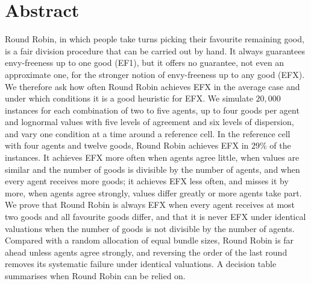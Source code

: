 \chapter*{Abstract}

Round Robin, in which people take turns picking their favourite remaining good, is a fair
division procedure that can be carried out by hand. It always guarantees envy-freeness up to one
good (EF1), but it offers no guarantee, not even an approximate one, for the stronger notion of
envy-freeness up to any good (EFX). We therefore ask how often Round Robin achieves EFX in the
average case and under which conditions it is a good heuristic for EFX. We simulate
$20{,}000$ instances for each combination of two to five agents, up to four goods per agent and
lognormal values with five levels of agreement and six levels of dispersion, and vary one
condition at a time around a reference cell. In the reference cell with four agents and twelve
goods, Round Robin achieves EFX in $29\%$ of the instances. It achieves EFX more often when agents
agree little, when values are similar and the number of goods is divisible by the number of
agents, and when every agent receives more goods; it achieves EFX less often, and misses it by
more, when agents agree strongly, values differ greatly or more agents take part. We prove that
Round Robin is always EFX when every agent receives at most two goods and all favourite goods
differ, and that it is never EFX under identical valuations when the number of goods is not
divisible by the number of agents. Compared with a random allocation of equal bundle sizes,
Round Robin is far ahead unless agents agree strongly, and reversing the order of the last round
removes its systematic failure under identical valuations. A decision table summarises when Round
Robin can be relied on.
